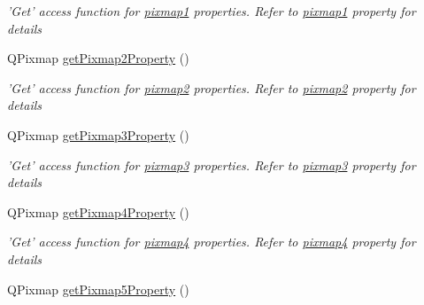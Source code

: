\begin{DoxyCompactItemize}
\begin{DoxyCompactList}\small\item\em 'Get' access function for \hyperlink{classQELabel_a825fa1c02e643af57502d686354712cc}{pixmap1} properties. Refer to \hyperlink{classQELabel_a825fa1c02e643af57502d686354712cc}{pixmap1} property for details \end{DoxyCompactList}\item 
\hypertarget{classQELabel_a26836884eb7ad62923f5c87f7e5fcf52}{
QPixmap \hyperlink{classQELabel_a26836884eb7ad62923f5c87f7e5fcf52}{getPixmap2Property} ()}
\label{classQELabel_a26836884eb7ad62923f5c87f7e5fcf52}

\begin{DoxyCompactList}\small\item\em 'Get' access function for \hyperlink{classQELabel_ac325b3d9005dd3e7747d9124a8b7618c}{pixmap2} properties. Refer to \hyperlink{classQELabel_ac325b3d9005dd3e7747d9124a8b7618c}{pixmap2} property for details \end{DoxyCompactList}\item 
\hypertarget{classQELabel_abdadc5b2e2e3f06c67608e16847fff76}{
QPixmap \hyperlink{classQELabel_abdadc5b2e2e3f06c67608e16847fff76}{getPixmap3Property} ()}
\label{classQELabel_abdadc5b2e2e3f06c67608e16847fff76}

\begin{DoxyCompactList}\small\item\em 'Get' access function for \hyperlink{classQELabel_a57180f761e931d984882e18a696feda7}{pixmap3} properties. Refer to \hyperlink{classQELabel_a57180f761e931d984882e18a696feda7}{pixmap3} property for details \end{DoxyCompactList}\item 
\hypertarget{classQELabel_a08353e3dcc6c8907f25cf6d8d57d20a0}{
QPixmap \hyperlink{classQELabel_a08353e3dcc6c8907f25cf6d8d57d20a0}{getPixmap4Property} ()}
\label{classQELabel_a08353e3dcc6c8907f25cf6d8d57d20a0}

\begin{DoxyCompactList}\small\item\em 'Get' access function for \hyperlink{classQELabel_ad7454834a438e24744fbaca27cf75f80}{pixmap4} properties. Refer to \hyperlink{classQELabel_ad7454834a438e24744fbaca27cf75f80}{pixmap4} property for details \end{DoxyCompactList}\item 
\hypertarget{classQELabel_a246ed80a8aec5f591fcc8551958b7917}{
QPixmap \hyperlink{classQELabel_a246ed80a8aec5f591fcc8551958b7917}{getPixmap5Property} ()}
\label{classQELabel_a246ed80a8aec5f591fcc8551958b7917}


\end{DoxyCompactItemize}
